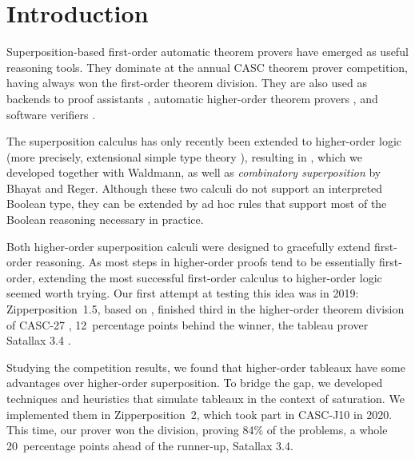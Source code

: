 \documentclass[smallcondensed,draft]{svjour3}     %
\begin{document}

\newcommand{\confrep}[2]{#2}

\section{Introduction}
\label{sec:satfol:ho-tech:intro}

Superposition-based first-order automatic theorem provers
have emerged as useful reasoning tools. They dominate at the annual CASC
\cite{gs-2016-casc} theorem prover competition, having always won the
first-order theorem division. They are also used as backends to proof assistants
\cite{ck-18-coqhammer,ku-15-holyhammer,pb-12-sh}, automatic
higher-order theorem provers \cite{sb-21-leo3}, and software verifiers
\cite{fp-13-why3}.

The superposition calculus has only recently been extended
to higher-order logic (more precisely, extensional simple type theory
\cite{henkin-1950-completeness}), resulting in
\emph{\lsup} \cite{bentkamp-et-al-2021-lamsup-journal}, which we developed
together with Waldmann, as well as \emph{combinatory superposition}
\cite{br-20-full-sup-w-combs} by Bhayat and Reger. Although these two
calculi do not support an interpreted Boolean type,
they can be extended by ad hoc rules \cite{our-bool-paper} that support
most of the Boolean reasoning necessary in practice.

Both higher-order superposition calculi were designed to gracefully
extend first-order reasoning. As most steps in higher-order
proofs tend to be essentially first-order, extending the most successful first-order
calculus to higher-order logic seemed worth trying.
Our first attempt at testing this idea was in 2019:
Zipperposition~1.5, based on \lsup, finished third
in the higher-order theorem division of CASC-27 \cite{gs-19-casc27},
12~percentage points behind the winner, the tableau prover Satallax 3.4 \cite{cb-2013-satallax}.

Studying the competition results, we found that higher-order tableaux have
some advantages over higher-order superposition. To bridge the gap, we developed
techniques and heuristics that simulate tableaux in the
context of saturation. We implemented them in Zipperposition~2, which took part
in CASC-J10 \cite{gs-21-cascj10} in 2020. This time, our prover won the division, proving 84\% of
the problems, a whole 20~percentage points ahead of the runner-up, Satallax
3.4.
\end{document}
